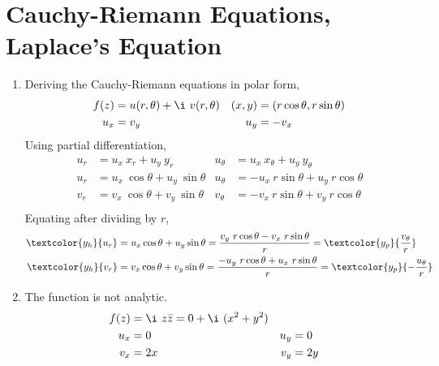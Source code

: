 \section{Cauchy-Riemann Equations, Laplace's Equation}

\begin{enumerate}
    \item Deriving the Cauchy-Riemann equations in polar form,
          \begin{align}
              f(z)   & = u(r, \theta) + \i\ v(r, \theta) &
              (x, y) & = (r\cos\theta, r\sin\theta)        \\
              u_x    & = v_y                             &
              u_y    & = -v_x
          \end{align}
          Using partial differentiation,
          \begin{align}
              u_r      & = u_x\ x_r + u_y\ y_r                  &
              u_\theta & = u_x\ x_\theta + u_y\ y_\theta          \\
              u_r      & = u_x\ \cos\theta + u_y\ \sin\theta    &
              u_\theta & = -u_x\ r\sin\theta + u_y\ r\cos\theta   \\
              v_r      & = v_x\ \cos\theta + v_y\ \sin\theta    &
              v_\theta & = -v_x\ r\sin\theta + v_y\ r\cos\theta   \\
          \end{align}
          Equating after dividing by $ r $,
          \begin{align}
              \textcolor{y_h}{u_r} & = u_x \cos\theta + u_y\sin\theta
              = \frac{v_y\ r\cos\theta - v_x\ r\sin\theta}{r} =
              \textcolor{y_p}{\frac{v_\theta}{r}}                     \\
              \textcolor{y_h}{v_r} & = v_x \cos\theta + v_y\sin\theta
              = \frac{-u_y\ r\cos\theta + u_x\ r\sin\theta}{r} =
              \textcolor{y_p}{-\frac{u_\theta}{r}}
          \end{align}

    \item The function is \textcolor{y_p}{not analytic}.
          \begin{align}
              f(z) & = \i\ z\bar{z} = 0 + \i\ (x^2 + y^2)   \\
              u_x  & = 0                                  &
              u_y  & = 0                                    \\
              v_x  & = 2x                                 &
              v_y  & = 2y
          \end{align}


\end{enumerate}
